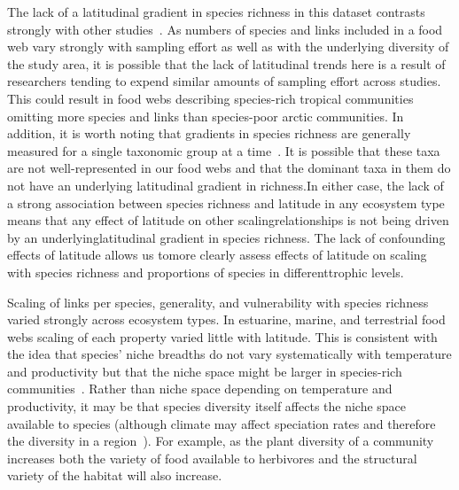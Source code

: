 \documentclass[12pt]{article}
\begin{document}
  The lack of a latitudinal gradient in species richness in this dataset
  contrasts strongly with other
  studies~\citep{Kaufman1995,Schemske2009,Macpherson2002}. As numbers of
  species and links included in a food web vary strongly with sampling effort
  as well as with the underlying diversity of the study area, it is possible
  that the lack of latitudinal trends here is a result of researchers tending
  to expend similar amounts of sampling effort across studies. This could
  result in food webs describing species-rich tropical communities omitting
  more species and links than species-poor arctic communities. In addition, it
  is worth noting that gradients in species richness are generally measured
  for a single taxonomic group at a
  time~\citep[e.g.]{Kaufman1995,Schemske2009,Macpherson2002}. It is possible
  that these taxa are not well-represented in our food webs and that the
  dominant taxa in them do not have an underlying latitudinal gradient in
  richness.In either case, the lack of a strong association between species
  richness and latitude in any ecosystem type means that any effect of
  latitude on other scalingrelationships is not being driven by an
  underlyinglatitudinal gradient in species richness. The lack of confounding
  effects of latitude allows us tomore clearly assess effects of latitude on
  scaling with species richness and proportions of species in differenttrophic
  levels.


  Scaling of links per species, generality, and vulnerability with species
  richness varied strongly across ecosystem types. In estuarine, marine, and
  terrestrial food webs scaling of each property varied little with latitude.
  This is consistent with the idea that species' niche breadths do not vary
  systematically with temperature and productivity but that the niche space
  might be larger in species-rich communities~\citep{Davies2007}. Rather than
  niche space depending on temperature and productivity, it may be that species
  diversity itself affects the niche space available to species (although climate
  may affect speciation rates and therefore the diversity in a region~\citep{Currie2004}). 
  For example, as the plant diversity of a community increases both the 
  variety of food available to herbivores and the structural variety of the habitat will also increase.
\end{document}
